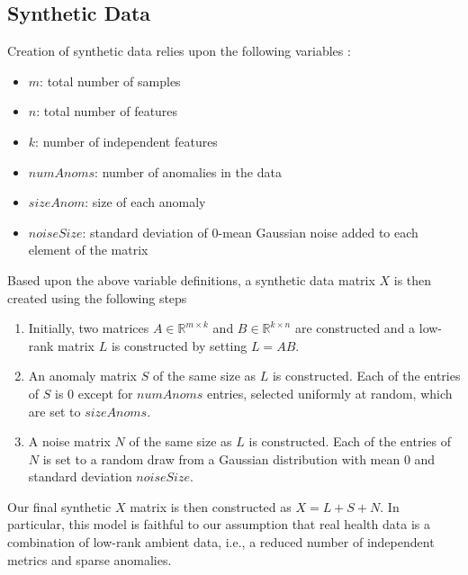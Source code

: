 \documentclass[conference]{IEEEtran}
\begin{document}
\subsection{Synthetic Data}

Creation of synthetic data relies upon the following variables :
\begin{itemize}
\item $m$: total number of samples
\item $n$: total number of features 
\item $k$: number of independent features
\item $numAnoms$: number of anomalies in the data
\item $sizeAnom$: size of each anomaly
\item $noiseSize$: standard deviation of $0$-mean Gaussian noise added to each element of the matrix 
\end{itemize}

Based upon the above variable definitions, a synthetic data matrix $X$ is then created using the following steps
\begin{enumerate}
\item Initially, two matrices $A \in \mathbb{R}^{m \times k}$ and $B \in \mathbb{R}^{k \times n}$ are constructed and a low-rank matrix $L$ is constructed by setting $L = AB$.
\item An anomaly matrix $S$ of the same size as $L$ is constructed.  Each of the entries of $S$ is $0$ except for $numAnoms$ entries, selected uniformly at random, which are set to $sizeAnoms$.
\item A noise matrix $N$ of the same size as $L$ is constructed. Each of the entries of $N$ is set to a random draw from a Gaussian distribution with mean $0$ and standard deviation $noiseSize$.
\end{enumerate}
\noindent Our final synthetic $X$ matrix is then constructed as $X=L+S+N$.  In particular, this model is faithful to  our assumption that real health data  is a combination of low-rank ambient data, i.e., a reduced number of independent metrics and sparse anomalies.
\end{document}
